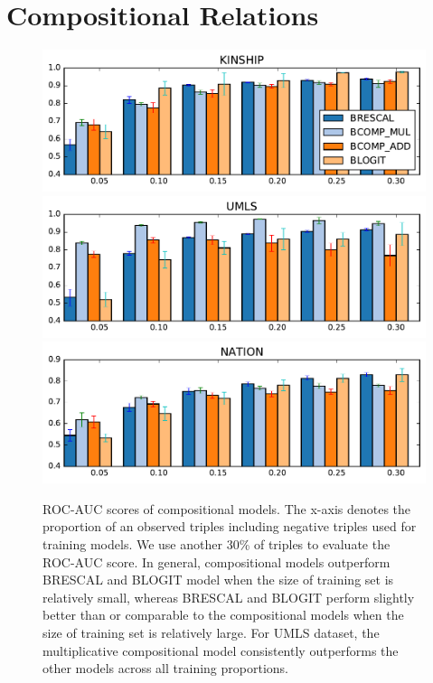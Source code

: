 \documentclass{article}
\begin{document}
\section{Compositional Relations}

\begin{figure}[t]
	\centering
	\includegraphics[width=\linewidth]{images/comp_training_error_kinship.pdf}
	\includegraphics[width=\linewidth]{images/comp_training_error_umls.pdf}			
	\includegraphics[width=\linewidth]{images/comp_training_error_nation.pdf}				
	\caption{\label{fig:r_vs_br} ROC-AUC scores of compositional models. The x-axis denotes the proportion of an observed triples including negative triples used for training models. We  use another 30\% of triples to evaluate the ROC-AUC score. In general, compositional models outperform BRESCAL and BLOGIT model when the size of training set is relatively small, whereas BRESCAL and BLOGIT perform slightly better than or comparable to the compositional models when the size of training set is relatively large. For UMLS dataset, the multiplicative compositional model consistently outperforms the other models across all training proportions.}
\end{figure}
\end{document}

